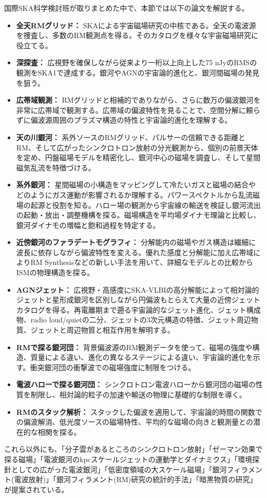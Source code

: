 国際SKA科学検討班が取りまとめた中で、本節では以下の論文を解説する。
\begin{itemize}
\item {\bf 全天RMグリッド：} SKAによる宇宙磁場研究の中核である。全天の電波源を捜査し、多数のRM観測点を得る。そのカタログを様々な宇宙磁場研究に役立てる。
\item {\bf 深探査：} 広視野を確保しながら従来より一桁以上向上した75 nJyのRMSの観測をSKA1で達成する。銀河やAGNの宇宙論的進化と、銀河間磁場の発見を狙う。
\item {\bf 広帯域観測：} RMグリッドと相補的でありながら、さらに数万の偏波銀河を非常に広帯域で観測する。広帯域の偏波特性を見ることで、空間分解に頼らずに偏波源周囲のプラズマ構造の特性と宇宙論的進化を理解する。
\item {\bf 天の川銀河：} 系外ソースのRMグリッド、パルサーの信頼できる距離とRM、そして広がったシンクロトロン放射の分光観測から、個別の前景天体を定め、円盤磁場モデルを精密化し、銀河中心の磁場を調査し、そして星間磁気乱流を特徴づける。
\item {\bf 系外銀河：} 星間磁場の小構造をマッピングして冷たいガスと磁場の結合やどのようにガス運動が影響されるか理解する。パワースペクトルから乱流磁場の起源と役割を知る。ハロー場の観測から宇宙線の輸送を検証し銀河流出の起動・放出・調整機構を探る。磁場構造を平均場ダイナモ理論と比較し、銀河ダイナモの増幅と飽和過程を特定する。
\item {\bf 近傍銀河のファラデートモグラフィ：} 分解能内の磁場やガス構造は繊細に波長に依存しながら偏波特性を変える。優れた感度と分解能に加え広帯域によりRM Synthesisなどの新しい手法を用いて、詳細なモデルとの比較からISMの物理構造を探る。
\item {\bf AGNジェット：} 広視野・高感度にSKA-VLBIの高分解能によって相対論的ジェットと星形成銀河を区別しながら円偏波もとらえて大量の近傍ジェットカタログを得る。再電離期まで遡る宇宙論的なジェット進化、ジェット構成物、radio loud/quietの二分、ジェットの3次元構造の特徴、ジェット周辺物質、ジェットと周辺物質と相互作用を解明する。
\item {\bf RMで探る銀河団：} 背景偏波源のRM観測データを使って、磁場の強度や構造、質量による違い、進化の異なるステージによる違い、宇宙論的進化を示す。衝突銀河団の衝撃波での磁場強度に制限をつける。
\item {\bf 電波ハローで探る銀河団：} シンクロトロン電波ハローから銀河団の磁場の性質を制限し、相対論的粒子の加速や輸送の物理に基礎的な制限を導く。
\item {\bf RMのスタック解析：} スタックした偏波を適用して、宇宙論的時間の関数での偏波解消、低光度ソースの磁場特性、平均的な磁場の向きと観測量との潜在的な相関を探る。
\end{itemize}
これら以外にも、「分子雲があるところのシンクロトロン放射」「ゼーマン効果で探る磁場」「電波銀河のkpcスケールジェットの運動学とダイナミクス」「環境探針としての広がった電波銀河」「低密度領域の大スケール磁場」「銀河フィラメント(電波放射)」「銀河フィラメント(RM)研究の統計的手法」「暗黒物質の研究」が提案されている。

